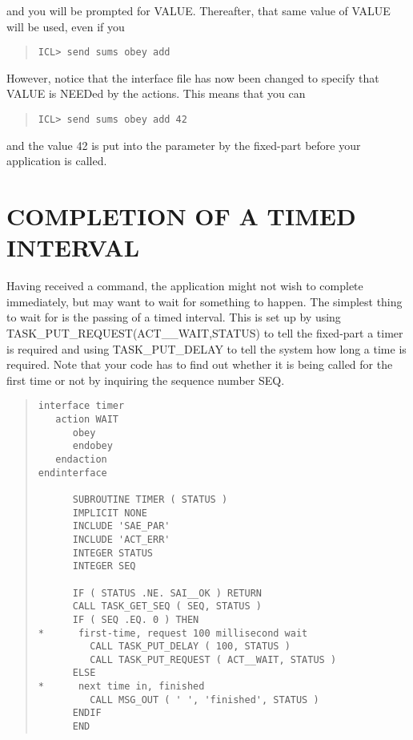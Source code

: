 and you will be prompted for VALUE. Thereafter, that same value of VALUE 
will be used, even if you

\small \begin{quote} \begin{verbatim}
ICL> send sums obey add
\end{verbatim} \end{quote} \normalsize

However, notice that the interface file has now been changed to specify that 
VALUE is NEEDed by the actions. This means that you can

\small \begin{quote} \begin{verbatim}
ICL> send sums obey add 42
\end{verbatim} \end{quote} \normalsize

and the value 42 is put into the parameter by the fixed-part before your 
application is called.


\section{COMPLETION OF A TIMED INTERVAL}

Having received a command, the application might not wish to complete
immediately, but may want to wait for something to happen. The simplest
thing to wait for is the passing of a timed interval. This is set up by
using TASK\_PUT\_REQUEST(ACT\_\_WAIT,STATUS) to tell the fixed-part a
timer is required and using TASK\_PUT\_DELAY to tell the system how long
a time is required. Note that your code has to find out whether it is
being called for the first time or not by inquiring the sequence number
SEQ. 

\small \begin{quote} \begin{verbatim}
interface timer
   action WAIT
      obey
      endobey
   endaction
endinterface

      SUBROUTINE TIMER ( STATUS )
      IMPLICIT NONE
      INCLUDE 'SAE_PAR'
      INCLUDE 'ACT_ERR'
      INTEGER STATUS
      INTEGER SEQ

      IF ( STATUS .NE. SAI__OK ) RETURN
      CALL TASK_GET_SEQ ( SEQ, STATUS )
      IF ( SEQ .EQ. 0 ) THEN
*      first-time, request 100 millisecond wait
         CALL TASK_PUT_DELAY ( 100, STATUS )
         CALL TASK_PUT_REQUEST ( ACT__WAIT, STATUS )
      ELSE
*      next time in, finished
         CALL MSG_OUT ( ' ', 'finished', STATUS )
      ENDIF
      END
\end{verbatim} \end{quote} \normalsize

